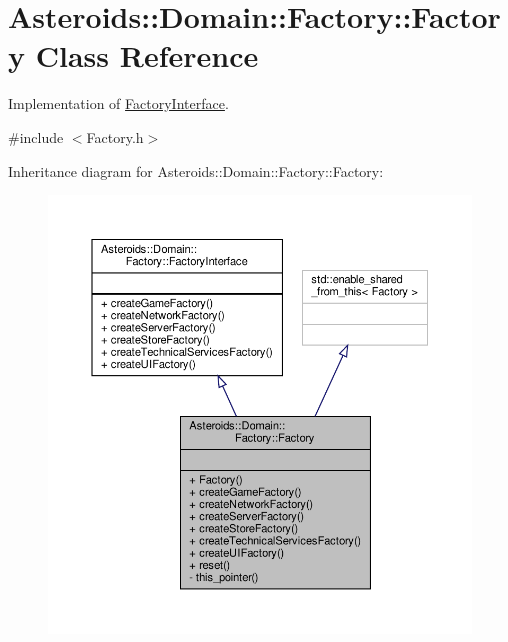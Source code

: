 \hypertarget{classAsteroids_1_1Domain_1_1Factory_1_1Factory}{}\section{Asteroids\+:\+:Domain\+:\+:Factory\+:\+:Factory Class Reference}
\label{classAsteroids_1_1Domain_1_1Factory_1_1Factory}


Implementation of \hyperlink{classAsteroids_1_1Domain_1_1Factory_1_1FactoryInterface}{Factory\+Interface}.  




{\ttfamily \#include $<$Factory.\+h$>$}



Inheritance diagram for Asteroids\+:\+:Domain\+:\+:Factory\+:\+:Factory\+:\nopagebreak
\begin{figure}[H]
\begin{center}
\leavevmode
\includegraphics[width=350pt]{classAsteroids_1_1Domain_1_1Factory_1_1Factory__inherit__graph}
\end{center}
\end{figure}


